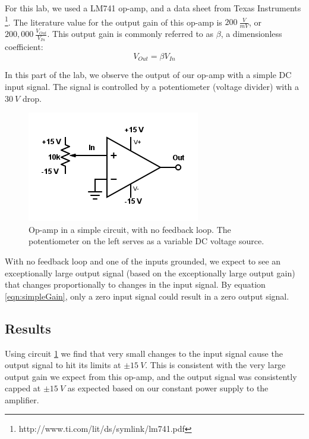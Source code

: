\documentclass[11pt]{article}
\begin{document}
For this lab, we used a LM741 op-amp, and a data sheet from Texas Instruments \footnote{http://www.ti.com/lit/ds/symlink/lm741.pdf}. The literature value for the output gain of this op-amp is $200\ \frac{V}{mV}$, or $200,000\ \frac{V_{Out}}{V_{In}}$. This output gain is commonly referred to as $\beta$, a dimensionless coefficient:\\

\begin{equation}
    V_{Out} = \beta V_{In}
    \label{eqn:simpleGain}
\end{equation}

In this part of the lab, we observe the output of our op-amp with a simple DC input signal. The signal is controlled by a potentiometer (voltage divider) with a $30\ V$ drop.\\

\begin{figure}[H]
    \centering
    \includegraphics[scale=0.5]{Diagrams/c-a.png}
    \caption{Op-amp in a simple circuit, with no feedback loop. The potentiometer on the left serves as a variable DC voltage source.}
    \label{circuit:a}
\end{figure}

With no feedback loop and one of the inputs grounded, we expect to see an exceptionally large output signal (based on the exceptionally large output gain) that changes proportionally to changes in the input signal. By equation \ref{eqn:simpleGain}, only a zero input signal could result in a zero output signal.\\


\subsection{Results}

Using circuit \ref{circuit:a} we find that very small changes to the input signal cause the output signal to hit its limits at $\pm 15\ V$. This is consistent with the very large output gain we expect from this op-amp, and the output signal was consistently capped at $\pm 15\ V$ as expected based on our constant power supply to the amplifier.\\
\end{document}
